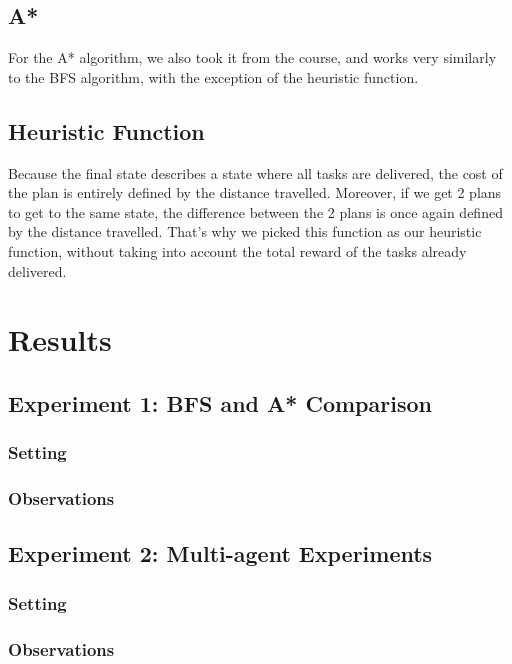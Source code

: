 \documentclass[11pt]{article}
\begin{document}
\subsection{A*}
For the A* algorithm, we also took it from the course, and works very similarly to the BFS algorithm, with the exception of the heuristic function.

\subsection{Heuristic Function}
Because the final state describes a state where all tasks are delivered, the cost of the plan is entirely defined by the distance travelled. Moreover, if we get 2 plans to get to the same state, the difference between the 2 plans is once again defined by the distance travelled. That's why we picked this function as our heuristic function, without taking into account the total reward of the tasks already delivered.


\section{Results}

\subsection{Experiment 1: BFS and A* Comparison}

\subsubsection{Setting}

\subsubsection{Observations}


\subsection{Experiment 2: Multi-agent Experiments}

\subsubsection{Setting}

\subsubsection{Observations}
\end{document}
